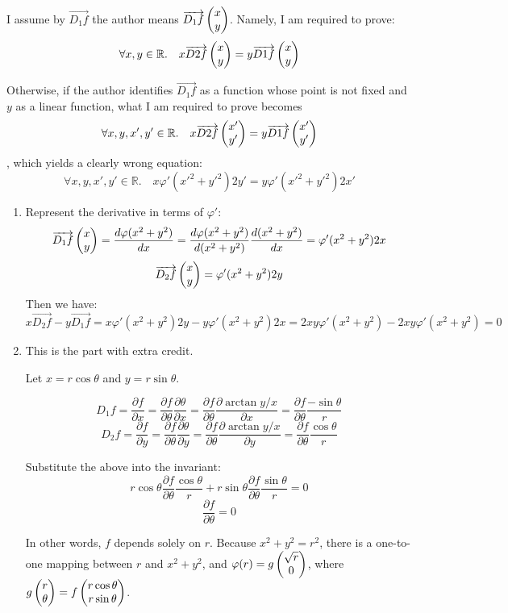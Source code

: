 \documentclass{homework}
\begin{document}
\begin{problem}{6}
I assume by $\overrightarrow{D_1f}$ the author means $\overrightarrow{D_1f}\begin{pmatrix}x\\y\end{pmatrix}$. Namely, I am required to prove:
$$\forall x, y \in \mathbb{R}. \quad x\overrightarrow{D2f}\begin{pmatrix}x\\y\end{pmatrix} = y\overrightarrow{D1f}\begin{pmatrix}x\\y\end{pmatrix}$$

Otherwise, if the author identifies $\overrightarrow{D_1f}$ as a function whose point is not fixed and $y$ as a linear function, what I am required to prove becomes
$$\forall x, y, x', y' \in \mathbb{R}. \quad x\overrightarrow{D2f}\begin{pmatrix}x'\\y'\end{pmatrix} = y\overrightarrow{D1f}\begin{pmatrix}x'\\y'\end{pmatrix}$$
, which yields a clearly wrong equation:
$$\forall x, y, x', y' \in \mathbb{R}. \quad x\varphi'(x'^2+y'^2)2y' = y\varphi'(x'^2+y'^2)2x'$$

\begin{enumerate}
\item Represent the derivative in terms of $\varphi'$:
$$\overrightarrow{D_1f}\begin{pmatrix}x\\y\end{pmatrix} = \frac{d\varphi(x^2+y^2)}{dx} = \frac{d\varphi(x^2+y^2)}{d(x^2+y^2)}\frac{d(x^2+y^2)}{dx} = \varphi'(x^2+y^2)2x$$
$$\overrightarrow{D_2f}\begin{pmatrix}x\\y\end{pmatrix} = \varphi'(x^2+y^2)2y$$
Then we have:
$$x\overrightarrow{D_2f} - y\overrightarrow{D_1f} = x\varphi'(x^2+y^2)2y - y\varphi'(x^2+y^2)2x = 2xy\varphi'(x^2+y^2) - 2xy\varphi'(x^2+y^2) = 0$$
\item This is the part with extra credit.

Let $x = r\cos\theta$ and $y = r\sin\theta$.

$$D_1f = \frac{\partial f}{\partial x} = \frac{\partial f}{\partial \theta}\frac{\partial \theta}{\partial x} =
\frac{\partial f}{\partial \theta}\frac{\partial \arctan{y/x}}{\partial x}
= \frac{\partial f}{\partial \theta}\frac{-\sin\theta}{r}$$
$$D_2f = \frac{\partial f}{\partial y} = \frac{\partial f}{\partial \theta}\frac{\partial \theta}{\partial y} =
\frac{\partial f}{\partial \theta}\frac{\partial \arctan{y/x}}{\partial y}
= \frac{\partial f}{\partial \theta}\frac{\cos\theta}{r}$$

Substitute the above into the invariant:
$$r\cos\theta\frac{\partial f}{\partial \theta}\frac{\cos\theta}{r} + r\sin\theta\frac{\partial f}{\partial \theta}\frac{\sin\theta}{r} = 0$$
$$\frac{\partial f}{\partial \theta} = 0$$

In other words, $f$ depends solely on $r$. Because $x^2 + y^2 = r^2$, there is a one-to-one mapping between $r$ and $x^2 + y^2$, and $\varphi(r) = g\begin{pmatrix}\sqrt{r}\\0\end{pmatrix}$, where $g \begin{pmatrix}r\\\theta\end{pmatrix} = f\begin{pmatrix}r\cos\theta\\r\sin\theta\end{pmatrix}$.
\end{enumerate}
\end{problem}
\end{document}
